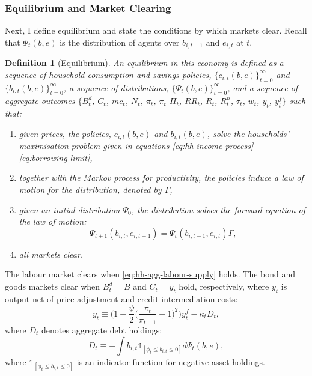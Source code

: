 \documentclass[a4paper,12pt]{article} %
\numberwithin{equation}{section} %
\numberwithin{figure}{section}
\numberwithin{table}{section}
\newtheorem{definition}{Definition}
\begin{document}
\subsubsection{Equilibrium and Market Clearing}
\label{sec:model-eq}

Next, I define equilibrium and state the conditions by which markets clear. Recall that $\Psi_t (b,e)$ is the distribution of agents over $b_{i,t-1}$ and $e_{i,t}$ at $t$.

\begin{definition}[Equilibrium]
\label{def:eq}
An equilibrium in this economy is defined as a sequence of household consumption and savings policies, $\{ c_{i,t} (b, e) \}_{t=0}^{\infty}$ and $\{ b_{i,t} (b, e) \}_{t=0}^{\infty}$, a sequence of distributions, $\{ \Psi_t (b,e) \}_{t=0}^{\infty} $, and a sequence of aggregate outcomes $\{ B_t^d$, $C_t$, $mc_t$, $N_t$, $\pi_t$, $\tilde{\pi}_t$ $\Pi_t$, $RR_t$, $R_t$, $R_t^n$, $\tau_t$, $w_t$, $y_t$, $y_t^f \}$ such that:
\begin{enumerate}
    \item given prices, the policies, $c_{i,t} (b, e)$ and $b_{i,t} (b, e)$, solve the households' maximisation problem given in equations \eqref{eq:hh-income-process} -- \eqref{eq:borrowing-limit},
    \item together with the Markov process for productivity, the policies induce a law of motion for the distribution, denoted by $\Gamma$,
    \item given an initial distribution $\Psi_0$, the distribution solves the forward equation of the law of motion:
    \begin{equation*}
        \Psi_{t+1} (b_{i,t},e_{i,t+1}) = \Psi_{t} (b_{i,t-1},e_{i,t}) \Gamma,
    \end{equation*}
    \item all markets clear.
\end{enumerate}
\end{definition}


The labour market clears when \eqref{eq:hh-agg-labour-supply} holds. The bond and goods markets clear when $B_t^d = B$ and $C_t = y_t$ hold, respectively, where $y_t$ is output net of price adjustment and credit intermediation costs:
\begin{equation}
    y_t \equiv \Bigg( 1 - \frac{\psi}{2} \Bigg( \frac{\pi_t}{\pi_{t-1}} - 1 \Bigg)^2 \Bigg) y_t^f - \kappa_t D_t, \label{eq:effective-gdp}
\end{equation}
where $D_t$ denotes aggregate debt holdings:
\begin{equation}
    D_t \equiv - \int b_{i,t} \mathbb{1}_{[\phi_t \le b_{i,t} \le 0]} d \Psi_t (b,e), \label{eq:agg-debt}
\end{equation}
where $\mathbb{1}_{[\phi_t \le b_{i,t} \le 0]}$ is an indicator function for negative asset holdings.
\end{document}
